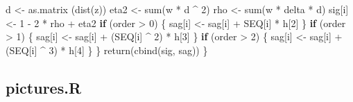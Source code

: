 \documentclass[
  12pt,
  letterpaper,
  DIV=11,
  numbers=noendperiod]{scrreprt}
\newenvironment{Shaded}{\begin{snugshade}}{\end{snugshade}}
\newcommand{\ControlFlowTok}[1]{\textcolor[rgb]{0.00,0.23,0.31}{\textbf{#1}}}
\newcommand{\DecValTok}[1]{\textcolor[rgb]{0.68,0.00,0.00}{#1}}
\newcommand{\FunctionTok}[1]{\textcolor[rgb]{0.28,0.35,0.67}{#1}}
\newcommand{\NormalTok}[1]{\textcolor[rgb]{0.00,0.23,0.31}{#1}}
\newcommand{\OtherTok}[1]{\textcolor[rgb]{0.00,0.23,0.31}{#1}}
\newcommand{\SpecialCharTok}[1]{\textcolor[rgb]{0.37,0.37,0.37}{#1}}
\theoremstyle{remark}
\begin{document}
\begin{Shaded}
\begin{Highlighting}[]
\NormalTok{    d }\OtherTok{\textless{}{-}} \FunctionTok{as.matrix}\NormalTok{ (}\FunctionTok{dist}\NormalTok{(z))}
\NormalTok{    eta2 }\OtherTok{\textless{}{-}} \FunctionTok{sum}\NormalTok{(w }\SpecialCharTok{*}\NormalTok{ d }\SpecialCharTok{\^{}} \DecValTok{2}\NormalTok{)}
\NormalTok{    rho }\OtherTok{\textless{}{-}} \FunctionTok{sum}\NormalTok{(w }\SpecialCharTok{*}\NormalTok{ delta }\SpecialCharTok{*}\NormalTok{ d)}
\NormalTok{    sig[i] }\OtherTok{\textless{}{-}} \DecValTok{1} \SpecialCharTok{{-}} \DecValTok{2} \SpecialCharTok{*}\NormalTok{ rho }\SpecialCharTok{+}\NormalTok{ eta2}
    \ControlFlowTok{if}\NormalTok{ (order }\SpecialCharTok{\textgreater{}} \DecValTok{0}\NormalTok{) \{}
\NormalTok{      sag[i] }\OtherTok{\textless{}{-}}\NormalTok{ sag[i] }\SpecialCharTok{+}\NormalTok{ SEQ[i] }\SpecialCharTok{*}\NormalTok{ h[}\DecValTok{2}\NormalTok{]}
\NormalTok{    \}}
    \ControlFlowTok{if}\NormalTok{ (order }\SpecialCharTok{\textgreater{}} \DecValTok{1}\NormalTok{) \{}
\NormalTok{      sag[i] }\OtherTok{\textless{}{-}}\NormalTok{ sag[i] }\SpecialCharTok{+}\NormalTok{ (SEQ[i] }\SpecialCharTok{\^{}} \DecValTok{2}\NormalTok{) }\SpecialCharTok{*}\NormalTok{ h[}\DecValTok{3}\NormalTok{]}
\NormalTok{    \}}
    \ControlFlowTok{if}\NormalTok{ (order }\SpecialCharTok{\textgreater{}} \DecValTok{2}\NormalTok{) \{}
\NormalTok{      sag[i] }\OtherTok{\textless{}{-}}\NormalTok{ sag[i] }\SpecialCharTok{+}\NormalTok{ (SEQ[i] }\SpecialCharTok{\^{}} \DecValTok{3}\NormalTok{) }\SpecialCharTok{*}\NormalTok{ h[}\DecValTok{4}\NormalTok{]}
\NormalTok{    \}}
\NormalTok{  \}}
  \FunctionTok{return}\NormalTok{(}\FunctionTok{cbind}\NormalTok{(sig, sag))}
\NormalTok{\}}
\end{Highlighting}
\end{Shaded}

\subsection*{pictures.R}\label{apcodepic}
\end{document}
